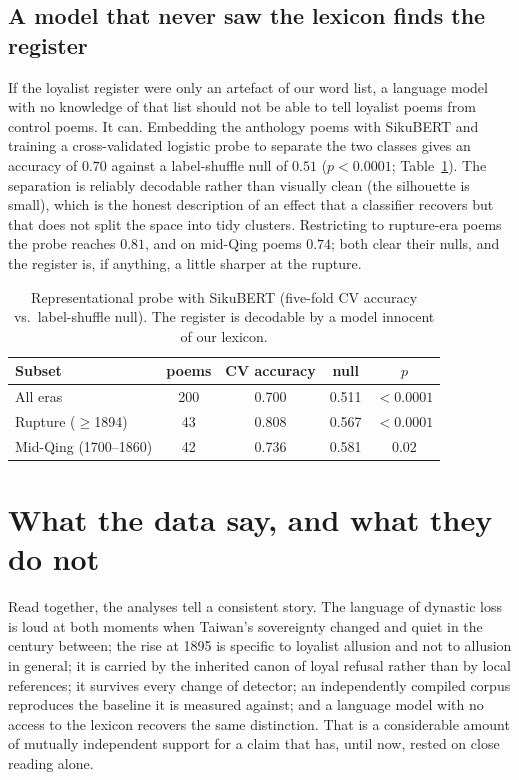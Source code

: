 \documentclass[10pt,twocolumn]{article}
\begin{document}
\subsection{A model that never saw the lexicon finds the register}
If the loyalist register were only an artefact of our word list, a language model with no
knowledge of that list should not be able to tell loyalist poems from control poems. It can.
Embedding the anthology poems with SikuBERT and training a cross-validated logistic probe to
separate the two classes gives an accuracy of $0.70$ against a label-shuffle null of $0.51$
($p<0.0001$; Table~\ref{tab:probe}). The separation is reliably decodable rather than
visually clean (the silhouette is small), which is the honest description of an effect that a
classifier recovers but that does not split the space into tidy clusters. Restricting to
rupture-era poems the probe reaches $0.81$, and on mid-Qing poems $0.74$; both clear their
nulls, and the register is, if anything, a little sharper at the rupture.

\begin{table}[t]
\centering
\footnotesize
\caption{Representational probe with SikuBERT (five-fold CV accuracy vs.\ label-shuffle null).
The register is decodable by a model innocent of our lexicon.}
\label{tab:probe}
\begin{tabular}{lcccc}
\toprule
Subset & poems & CV accuracy & null & $p$ \\
\midrule
All eras           & 200 & 0.700 & 0.511 & $<0.0001$ \\
Rupture ($\geq$1894) & 43  & 0.808 & 0.567 & $<0.0001$ \\
Mid-Qing (1700--1860) & 42 & 0.736 & 0.581 & $0.02$ \\
\bottomrule
\end{tabular}
\end{table}

\section{What the data say, and what they do not}
Read together, the analyses tell a consistent story. The language of dynastic loss is loud at
both moments when Taiwan's sovereignty changed and quiet in the century between; the rise at
1895 is specific to loyalist allusion and not to allusion in general; it is carried by the
inherited canon of loyal refusal rather than by local references; it survives every change of
detector; an independently compiled corpus reproduces the baseline it is measured against;
and a language model with no access to the lexicon recovers the same distinction. That is a
considerable amount of mutually independent support for a claim that has, until now, rested on
close reading alone.
\end{document}
